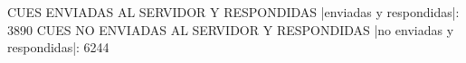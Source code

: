 CUES ENVIADAS AL SERVIDOR Y RESPONDIDAS
|enviadas y respondidas|: 3890
CUES NO ENVIADAS AL SERVIDOR Y RESPONDIDAS
|no enviadas y respondidas|: 6244